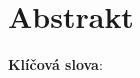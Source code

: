 
\openright

\section*{Abstrakt}

\CZAbstract

\vspace{5mm}

\noindent\textbf{Klíčová slova}:
\CZKeywords

%
%
%
%
%
%
%
%
%
%
%
%
%
%

\newpage

\openright
\pagestyle{plain}
\setcounter{page}{1}
